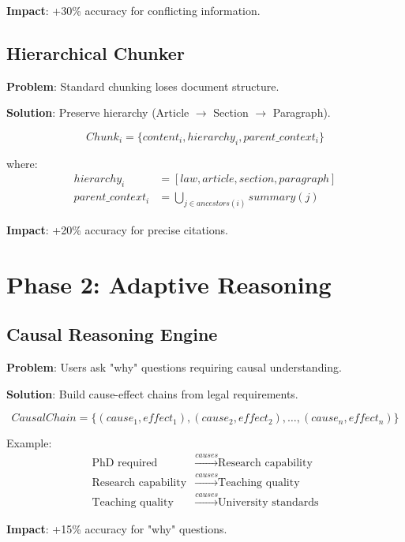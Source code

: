 \documentclass[12pt,a4paper]{article}
\begin{document}
\textbf{Impact}: +30\% accuracy for conflicting information.

\subsection{Hierarchical Chunker}


\textbf{Problem}: Standard chunking loses document structure.

\textbf{Solution}: Preserve hierarchy (Article $\rightarrow$ Section $\rightarrow$ Paragraph).

\begin{equation}
Chunk_i = \{content_i, hierarchy_i, parent\_context_i\}
\end{equation}

where:
\begin{align*}
hierarchy_i &= [law, article, section, paragraph] \\
parent\_context_i &= \bigcup_{j \in ancestors(i)} summary(j)
\end{align*}

\textbf{Impact}: +20\% accuracy for precise citations.

\section{Phase 2: Adaptive Reasoning}

\subsection{Causal Reasoning Engine}

\textbf{Problem}: Users ask "why" questions requiring causal understanding.

\textbf{Solution}: Build cause-effect chains from legal requirements.

\begin{equation}
CausalChain = \{(cause_1, effect_1), (cause_2, effect_2), \ldots, (cause_n, effect_n)\}
\end{equation}

Example:
\begin{align*}
\text{PhD required} &\xrightarrow{causes} \text{Research capability} \\
\text{Research capability} &\xrightarrow{causes} \text{Teaching quality} \\
\text{Teaching quality} &\xrightarrow{causes} \text{University standards}
\end{align*}

\textbf{Impact}: +15\% accuracy for "why" questions.
\end{document}
